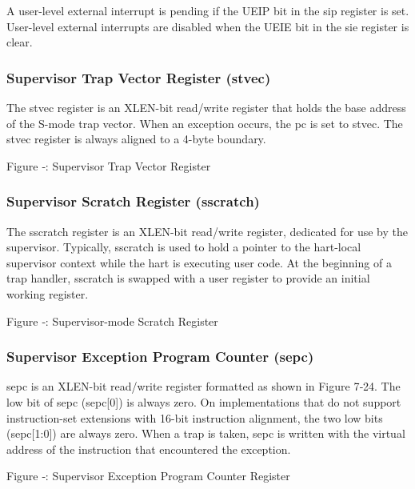 A user-level external interrupt is pending if the UEIP bit in the sip
register is set. User-level external interrupts are disabled when the
UEIE bit in the sie register is clear.

\subsubsection{Supervisor Trap Vector Register
(stvec)}\label{supervisor-trap-vector-register-stvec}

The stvec register is an XLEN-bit read/write register that holds the
base address of the S-mode trap vector. When an exception occurs, the pc
is set to stvec. The stvec register is always aligned to a 4-byte
boundary.

\missingfigure{}

Figure ‑: Supervisor Trap Vector Register

\subsubsection{Supervisor Scratch Register (sscratch)
}\label{supervisor-scratch-register-sscratch}

The sscratch register is an XLEN-bit read/write register, dedicated for
use by the supervisor. Typically, sscratch is used to hold a pointer to
the hart-local supervisor context while the hart is executing user code.
At the beginning of a trap handler, sscratch is swapped with a user
register to provide an initial working register.

\missingfigure{}

Figure ‑: Supervisor-mode Scratch Register

\subsubsection{Supervisor Exception Program Counter
(sepc)}\label{supervisor-exception-program-counter-sepc}

sepc is an XLEN-bit read/write register formatted as shown in Figure
7‑24. The low bit of sepc (sepc{[}0{]}) is always zero. On
implementations that do not support instruction-set extensions with
16-bit instruction alignment, the two low bits (sepc{[}1:0{]}) are
always zero. When a trap is taken, sepc is written with the virtual
address of the instruction that encountered the exception.

\missingfigure{}

\protect\hypertarget{_Ref367098363}{}{}Figure ‑: Supervisor Exception
Program Counter Register

